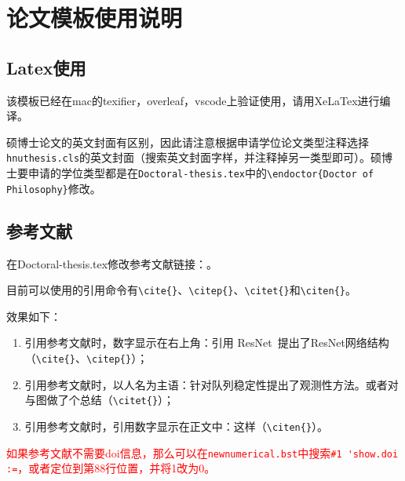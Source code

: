 \chapter{论文模板使用说明}
\section{Latex使用}
该模板已经在mac的texifier，overleaf，vscode上验证使用，请用XeLaTex进行编译。

硕博士论文的英文封面有区别，因此请注意根据申请学位论文类型注释选择\lstinline!hnuthesis.cls!的英文封面（搜索英文封面字样，并注释掉另一类型即可）。硕博士要申请的学位类型都是在\lstinline!Doctoral-thesis.tex!中的\lstinline!\endoctor{Doctor of Philosophy}!修改。


\section{参考文献}

在Doctoral-thesis.tex修改参考文献链接：\lstinline!!。

目前可以使用的引用命令有\lstinline!\cite{}!、\lstinline!\citep{}!、\lstinline!\citet{}!和\lstinline!\citen{}!。

效果如下：
\begin{enumerate}
	\item 引用参考文献时，数字显示在右上角：引用 ResNet~\cite{2020_aradi_Survey}提出了ResNet网络结构\citep{2020_aradi_Survey}（\lstinline!\cite{}!、\lstinline!\citep{}!）；
	\item 引用参考文献时，以人名为主语：\citet{2017_qinxiaohui_FeiYunZhiCheLiangDuiLieDeFenBuShiKongZhi}针对队列稳定性提出了观测性方法。或者\citet{2021_chen_Graph}对与图做了个总结（\lstinline!\citet{}!）；
	\item 引用参考文献时，引用数字显示在正文中：这样（\lstinline!\citen{}!）。
\end{enumerate}

\textcolor{red}{如果参考文献不需要doi信息，那么可以在\lstinline!newnumerical.bst!中搜索\lstinline!#1 'show.doi :=!，或者定位到第88行位置，并将1改为0。}


